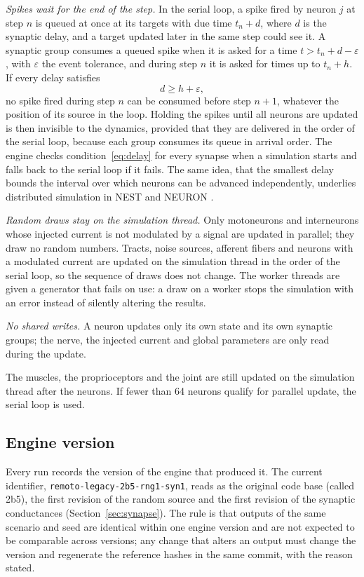 \documentclass[pdflatex,sn-apa,iicol]{sn-jnl}
\providecommand{\code}[1]{\texttt{#1}}
\begin{document}
\emph{Spikes wait for the end of the step.} In the serial loop, a spike fired by neuron $j$ at step $n$ is queued at once at its targets with due time $t_n + d$, where $d$ is the synaptic delay, and a target updated later in the same step could see it. A synaptic group consumes a queued spike when it is asked for a time $t > t_n + d - \varepsilon$, with $\varepsilon$ the event tolerance, and during step $n$ it is asked for times up to $t_n + h$. If every delay satisfies
\begin{equation}
d \ge h + \varepsilon , \label{eq:delay}
\end{equation}
no spike fired during step $n$ can be consumed before step $n+1$, whatever the position of its source in the loop. Holding the spikes until all neurons are updated is then invisible to the dynamics, provided that they are delivered in the order of the serial loop, because each group consumes its queue in arrival order. The engine checks condition~\eqref{eq:delay} for every synapse when a simulation starts and falls back to the serial loop if it fails. The same idea, that the smallest delay bounds the interval over which neurons can be advanced independently, underlies distributed simulation in NEST and NEURON \citep{Morrison2005,Hines2008}.

\emph{Random draws stay on the simulation thread.} Only motoneurons and interneurons whose injected current is not modulated by a signal are updated in parallel; they draw no random numbers. Tracts, noise sources, afferent fibers and neurons with a modulated current are updated on the simulation thread in the order of the serial loop, so the sequence of draws does not change. The worker threads are given a generator that fails on use: a draw on a worker stops the simulation with an error instead of silently altering the results.

\emph{No shared writes.} A neuron updates only its own state and its own synaptic groups; the nerve, the injected current and global parameters are only read during the update.

The muscles, the proprioceptors and the joint are still updated on the simulation thread after the neurons. If fewer than 64 neurons qualify for parallel update, the serial loop is used.

\subsection{Engine version}\label{sec:version}

Every run records the version of the engine that produced it. The current identifier, \code{remoto-legacy-\allowbreak 2b5-\allowbreak rng1-\allowbreak syn1}, reads as the original code base (called 2b5), the first revision of the random source and the first revision of the synaptic conductances (Section~\ref{sec:synapse}). The rule is that outputs of the same scenario and seed are identical within one engine version and are not expected to be comparable across versions; any change that alters an output must change the version and regenerate the reference hashes in the same commit, with the reason stated.
\end{document}
